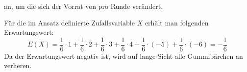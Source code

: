\begin{exercise}
    an, um die sich der Vorrat von \xya{} pro
    Runde verändert.
  \fi
  \ifoutcome\outcome\par
    Für die im Ansatz definierte Zufallsvariable
    $X$ erhält man folgenden Erwartungswert:
    \begin{equation*}
      E(X)=\frac{1}{6}\cdot1
          +\frac{1}{6}\cdot2
          +\frac{1}{6}\cdot3
          +\frac{1}{6}\cdot4
          +\frac{1}{6}\cdot(-5)
          +\frac{1}{6}\cdot(-6)
          =
          -\frac{\num{1}}{\num{6}}
    \end{equation*}
    Da der Erwartungswert negativ ist, wird
    \xya{} auf lange Sicht alle Gummibärchen
    an \xxb{} verlieren.
  \fi
\end{exercise}

